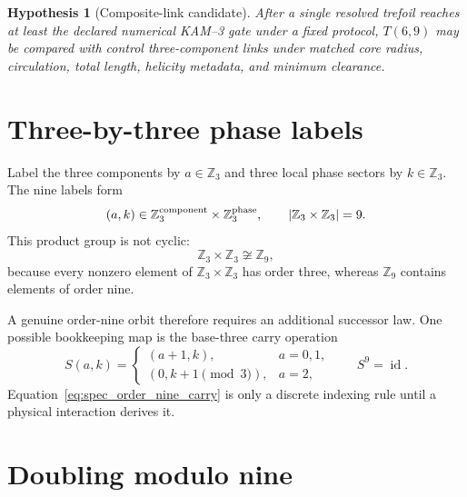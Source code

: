 \documentclass[11pt]{article}
\newtheorem{hypothesis}{Hypothesis}[section]
\newcommand{\Z}{\mathbb Z}
\begin{document}
\begin{hypothesis}[Composite-link candidate]
After a single resolved trefoil reaches at least the declared numerical
KAM--3 gate under a fixed protocol, $T(6,9)$ may be compared with control
three-component links under matched core radius, circulation, total length,
helicity metadata, and minimum clearance.
\end{hypothesis}

\section{Three-by-three phase labels}

Label the three components by $a\in\Z_3$ and three local phase sectors by
$k\in\Z_3$.  The nine labels form
\begin{equation}
    (a,k)\in\Z_3^{\rm component}\times\Z_3^{\rm phase},
    \qquad
    \left|\Z_3\times\Z_3\right|=9.
    \label{eq:spec_z3_product}
\end{equation}
This product group is not cyclic:
\begin{equation}
    \Z_3\times\Z_3\not\cong\Z_9,
\end{equation}
because every nonzero element of $\Z_3\times\Z_3$ has order three, whereas
$\Z_9$ contains elements of order nine.

A genuine order-nine orbit therefore requires an additional successor law.
One possible bookkeeping map is the base-three carry operation
\begin{equation}
    S(a,k)
    =
    \begin{cases}
    (a+1,k), & a=0,1,\\
    (0,k+1\!\!\pmod 3), & a=2,
    \end{cases}
    \qquad S^9=\operatorname{id}.
    \label{eq:spec_order_nine_carry}
\end{equation}
Equation~\eqref{eq:spec_order_nine_carry} is only a discrete indexing rule
until a physical interaction derives it.

\section{Doubling modulo nine}
\end{document}

